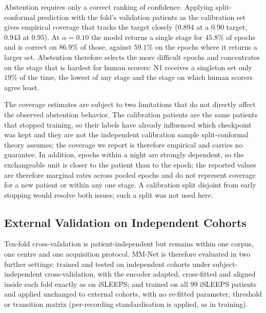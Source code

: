 \documentclass[a4paper,fleqn]{cas-sc}
\begin{document}
Abstention requires only a correct ranking of confidence. Applying split-conformal prediction with the
fold's validation patients as the calibration set gives empirical coverage that tracks the
target closely ($0.894$ at a $0.90$ target, $0.943$ at $0.95$). At $\alpha=0.10$ the model
returns a single stage for $45.8\%$ of epochs and is correct on $86.9\%$ of those, against
$59.1\%$ on the epochs where it returns a larger set. Abstention therefore selects the more difficult epochs and concentrates on the stage that is hardest for human scorers: N1 receives a singleton set only $19\%$ of the time, the lowest of any stage and the stage on which human scorers agree least.

The coverage estimates are subject to two limitations that do not directly affect the observed abstention behavior. The
calibration patients are the same patients that stopped training, so their labels have already
influenced which checkpoint was kept and they are not the independent calibration sample
split-conformal theory assumes; the coverage we report is therefore empirical and carries no
guarantee. In addition, epochs within a night are strongly dependent, so the exchangeable unit is closer to the patient than to the epoch; the reported values are therefore marginal rates across pooled epochs and do not represent coverage for a new patient or within any one stage. A calibration split disjoint from early stopping would resolve both issues; such a split was not used here.

\subsection{External Validation on Independent Cohorts}
\label{sec:external}
Ten-fold cross-validation is patient-independent but remains within one corpus, one centre
and one acquisition protocol. MM-Net is therefore evaluated in two further settings: trained
and tested on independent cohorts under subject-independent cross-validation, with the encoder
adapted, cross-fitted and aligned inside each fold exactly as on iSLEEPS; and trained on all
$99$ iSLEEPS patients and applied unchanged to external cohorts, with no re-fitted parameter,
threshold or transition matrix (per-recording standardisation is applied, as in training).
\end{document}
